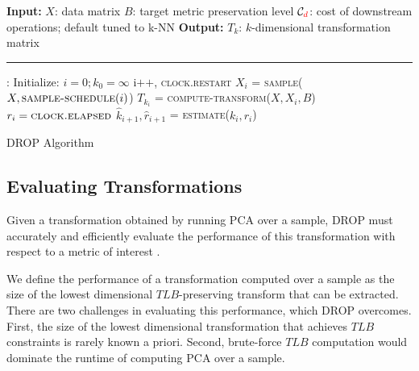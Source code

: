 \begin{algorithm}[t!]
\begin{algorithmic}[1]
\small
\Statex \textbf{Input:}  
\Statex $X$: data matrix
\Statex $B$: target metric preservation level
\Statex $\mathcal{C}_{\color{red}d}$: cost of downstream operations; default tuned to k-NN
\Statex
\Statex \textbf{Output:}   
\Statex $T_k$: $k$-dimensional transformation matrix
\Statex
\Statex \hrule
{}:
	\State Initialize: $i = 0; k_0 = \infty$ 
	\Do
		\State i$\texttt{++}$, \textsc{clock.restart}
		\State $X_i$ = \textsc{sample}($X, \textsc{sample-schedule}(i)$) \label{eq:sample}
			\Comment{\S~\ref{subsec:psample}}
		\State $T_{k_i}$ = \textsc{compute-transform}($X, X_i,  B$) \label{eq:evaluate}
			\Comment{\S~\ref{subsec:teval}}
		\State $r_i = \textsc{clock.elapsed}$	
		\State $\hat{k}_{i+1}, \hat{r}_{i+1} $ = \textsc{estimate}($k_i, r_i$) \label{eq:estimate}
			\Comment{\S~\ref{subsec:pest}}
	 \label{eq:optimize}
		\Comment{\S~\ref{subsec:opt}}
	\\
\EndFunction
\end{algorithmic}
\caption{DROP Algorithm}
\label{alg:DROP}
\end{algorithm}



\subsection{Evaluating Transformations}
\label{subsec:teval}
Given a transformation obtained by running PCA over a sample, DROP must accurately and efficiently evaluate the performance of this transformation with respect to a metric of interest . 

We define the performance of a transformation computed over a sample as the size of the lowest dimensional $TLB$-preserving transform that can be extracted.
There are two challenges in evaluating this performance, which DROP overcomes.
First, the size of the lowest dimensional transformation that achieves $TLB$ constraints is rarely known a priori. 
Second, brute-force $TLB$ computation would dominate the runtime of computing PCA over a sample.

